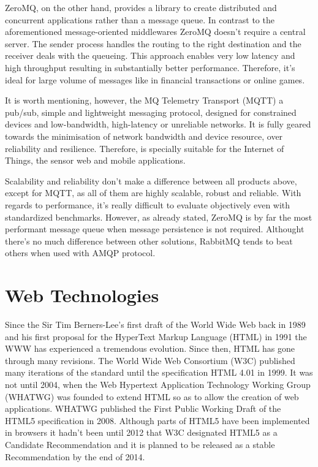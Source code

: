 ZeroMQ, on the other hand, provides a library to create distributed and concurrent applications rather than a message queue. In contrast to the aforementioned message-oriented middlewares ZeroMQ doesn't require a central server. The sender process handles the routing to the right destination and the receiver deals with the queueing. This approach enables very low latency and high throughput resulting in substantially better performance. Therefore, it's ideal for large volume of messages like in financial transactions or online games.

It is worth mentioning, however, the MQ Telemetry Transport (MQTT) a pub/sub, simple and lightweight messaging protocol, designed for constrained devices and low-bandwidth, high-latency or unreliable networks. It is fully geared towards the minimisation of network bandwidth and device resource, over reliability and resilience. Therefore, is specially suitable for the Internet of Things, the sensor web and mobile applications.

Scalability and reliability don't make a difference between all products above, except for MQTT, as all of them are highly scalable, robust and reliable. With regards to performance, it's really difficult to evaluate objectively even with standardized benchmarks. However, as already stated, ZeroMQ is by far the most performant message queue when message persistence is not required. Althought there's no much difference between other solutions, RabbitMQ tends to beat others when used with AMQP protocol.

\section{Web Technologies}

Since the Sir Tim Berners-Lee's first draft of the World Wide Web back in 1989 and his first proposal for the HyperText Markup Language (HTML) \cite{HTMLtags} in 1991 the WWW has experienced a tremendous evolution. Since then, HTML has gone through many revisions. The World Wide Web Consortium (W3C) published many iterations of the standard until the specification HTML 4.01 in 1999. It was not until 2004, when the Web Hypertext Application Technology Working Group (WHATWG) was founded to extend HTML so as to allow the creation of web applications. WHATWG published the First Public Working Draft of the HTML5 specification in 2008. Although parts of HTML5 have been implemented in browsers it hadn't been until 2012 that W3C designated HTML5 as a Candidate Recommendation and it is planned to be released as a stable Recommendation by the end of 2014.

